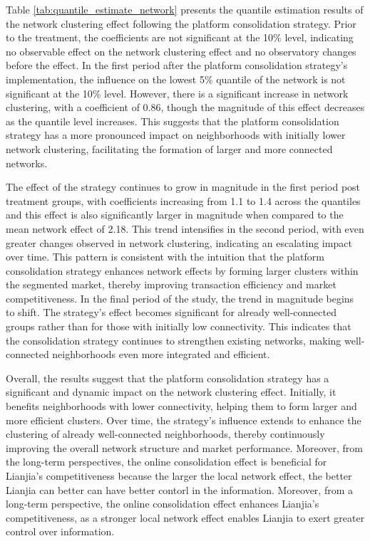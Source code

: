 \documentclass[11pt]{article}
\begin{document}
Table \ref{tab:quantile_estimate_network} presents the quantile estimation results of the network clustering effect following the platform consolidation strategy. Prior to the treatment, the coefficients are not significant at the 10\% level, indicating no observable effect on the network clustering effect and no observatory changes before the effect. In the first period after the platform consolidation strategy's implementation, the influence on the lowest 5\% quantile of the network is not significant at the 10\% level. However, there is a significant increase in network clustering, with a coefficient of 0.86, though the magnitude of this effect decreases as the quantile level increases. This suggests that the platform consolidation strategy has a more pronounced impact on neighborhoods with initially lower network clustering, facilitating the formation of larger and more connected networks.

The effect of the strategy continues to grow in magnitude in the first period post treatment groups, with coefficients increasing from 1.1 to 1.4 across the quantiles and this effect is also significantly larger in magnitude when compared to the mean network effect of 2.18. This trend intensifies in the second period, with even greater changes observed in network clustering, indicating an escalating impact over time. This pattern is consistent with the intuition that the platform consolidation strategy enhances network effects by forming larger clusters within the segmented market, thereby improving transaction efficiency and market competitiveness. In the final period of the study, the trend in magnitude begins to shift. The strategy's effect becomes significant for already well-connected groups rather than for those with initially low connectivity. This indicates that the consolidation strategy continues to strengthen existing networks, making well-connected neighborhoods even more integrated and efficient.

Overall, the results suggest that the platform consolidation strategy has a significant and dynamic impact on the network clustering effect. Initially, it benefits neighborhoods with lower connectivity, helping them to form larger and more efficient clusters. Over time, the strategy's influence extends to enhance the clustering of already well-connected neighborhoods, thereby continuously improving the overall network structure and market performance. Moreover, from the long-term perspectives, the online consolidation effect is beneficial for Lianjia's competitiveness because the larger the local network effect, the better Lianjia can better can have better contorl in the information. Moreover, from a long-term perspective, the online consolidation effect enhances Lianjia's competitiveness, as a stronger local network effect enables Lianjia to exert greater control over information.
\end{document}
